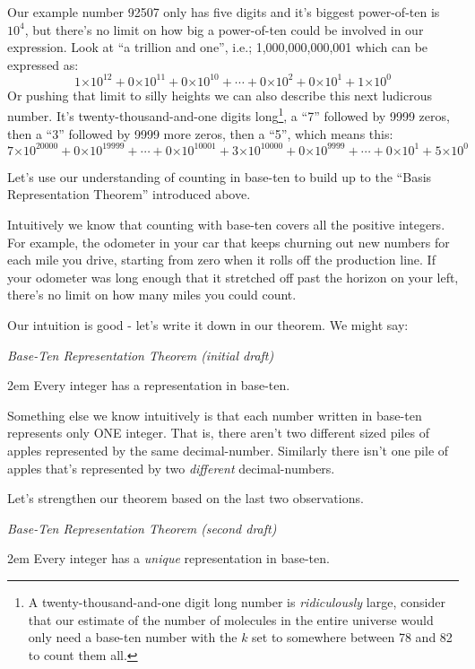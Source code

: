\documentclass{article}
\newenvironment{jprIn}{\begin{adjustwidth}{2em}{}}{\end{adjustwidth}}
\begin{document}
Our example number 92507 only has five digits and it's biggest power-of-ten is $10^4$,
but there's
no limit on how big a power-of-ten could be involved in our expression.
Look at ``a trillion and one'', i.e.; 1,000,000,000,001 which can be expressed as:
\[1{\times{}}10^{12}
+0{\times{}}10^{11}
+0{\times{}}10^{10}
+\cdots{}
+0{\times{}}10^{2}
+0{\times{}}10^{1}
+1{\times{}}10^{0}\]
%
Or pushing that limit to silly heights we can also describe this next ludicrous number.
It's twenty-thousand-and-one digits long\footnote{A twenty-thousand-and-one digit long number is 
\emph{ridiculously} large,
consider that our estimate of the number of molecules in
the entire universe would only need a base-ten
number with the $k$ set to somewhere between 78 and 82 to count them all.}, a
``7'' followed by 9999 zeros, then a ``3''
followed by 9999 more zeros, then a ``5'', which means this:
\[7{\times{}}10^{20000}
+0{\times{}}10^{19999}
+\cdots{}
+0{\times{}}10^{10001}
+3{\times{}}10^{10000}
+0{\times{}}10^{9999}
+\cdots{}
+0{\times{}}10^{1}
+5{\times{}}10^{0}\]

Let's use our understanding of counting in base-ten to build up to the
``Basis Representation Theorem'' introduced above.

Intuitively we know that counting with
base-ten covers all the positive integers.
For example, the odometer in your car that keeps churning out
new numbers for each mile you drive, starting from zero when it rolls
off the production line.  If your odometer was long enough that it 
stretched off past the horizon on your left, there's no limit on
how many miles you could count.

Our intuition is good - let's write it down
in our theorem. We might say:

\emph{Base-Ten Representation Theorem (initial draft)}
\begin{jprIn}
Every integer has a representation in base-ten.
\end{jprIn}

Something else we know intuitively is that each number written
in base-ten represents only ONE integer. That is, there aren't two different
sized piles of apples represented by the same decimal-number. Similarly there
isn't one pile of apples that's represented by two \emph{different} decimal-numbers.

Let's strengthen our theorem based on the last two observations.

\emph{Base-Ten Representation Theorem (second draft)}
\begin{jprIn}
Every integer has a \emph{unique} representation in base-ten.
\end{jprIn}
\end{document}
